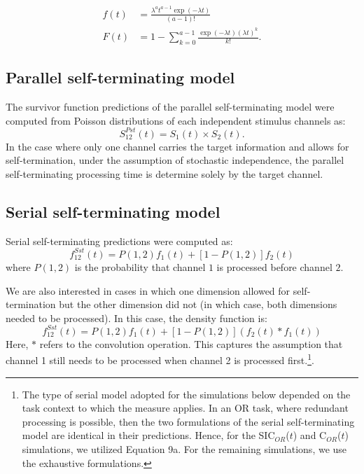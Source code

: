 \begin{align}
f(t) &= \frac{\lambda^a t^{a-1} \exp\left(-\lambda t\right)}{(a-1)!}\\
F(t) &= 1-  \sum_{k=0}^{a-1} \frac{\exp(-\lambda t)(\lambda t)^k}{k!}.
\end{align}

\subsection{Parallel self-terminating model} The survivor function predictions of the parallel self-terminating model were computed from Poisson distributions of each independent stimulus channels as:
\begin{equation} \tag{4}
	S^{Pst}_{12}(t) = S_1(t) \times S_2(t).
    \label{eq:parst}
\end{equation}
\noindent
In the case where only one channel carries the target information and allows for self-termination, under the assumption of stochastic independence, the parallel self-terminating processing time is determine solely by the target channel. 

\subsection{Serial self-terminating model} Serial self-terminating predictions were computed as:
\begin{equation} \tag{5a}
	f^{Sst}_{12}(t) = P(1,2) f_1(t) + [1-P(1,2)] f_2(t)
    \label{eq:serst}
\end{equation}
\noindent
where $P(1,2)$ is the probability that channel $1$ is processed before channel $2$. 

We are also interested in cases in which one dimension allowed for self-termination but the other dimension did not (in which case, both dimensions needed to be processed). In this case, the density function is:
\begin{equation} \tag{5b}
	f^{Sst}_{12}(t) = P(1,2) f_1(t) + [1-P(1,2)] (f_2(t) * f_1(t))
    \label{eq:serstmixed}
\end{equation}
Here, $*$ refers to the convolution operation.  This captures the assumption that channel 1 still needs to be processed when channel 2 is processed first.\footnote{The type of serial model adopted for the simulations below depended on the task context to which the measure applies. In an OR task, where redundant processing is possible, then the two formulations of the serial self-terminating model are identical in their predictions. Hence, for the SIC$_{OR}$($t$) and C$_{OR}$($t$) simulations, we utilized Equation 9a. For the remaining simulations, we use the exhaustive formulations.}.

